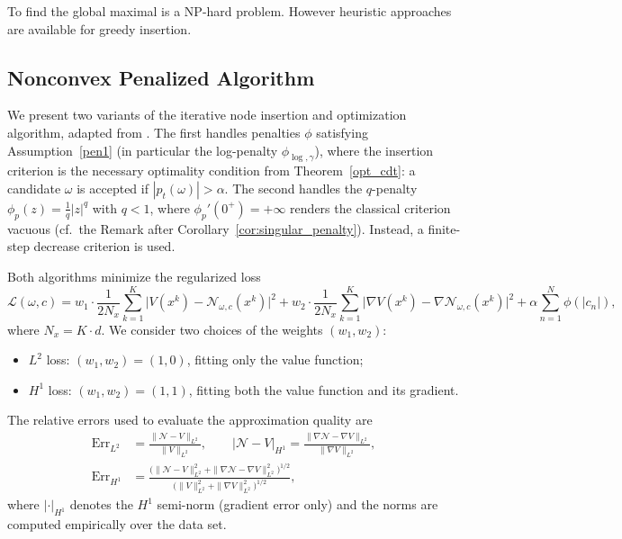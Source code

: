 \documentclass[12pt,fleqn]{amsart}
\theoremstyle{definition}
\begin{document}
To find the global maximal is a NP-hard problem. However heuristic approaches are available for greedy insertion.


\subsection{Nonconvex Penalized Algorithm}
We present two variants of the iterative node insertion and optimization algorithm, adapted from \cite{pieper2022nonconvex}.
The first handles penalties $\phi$ satisfying Assumption~\ref{pen1} (in particular the log-penalty $\phi_{\log, \gamma}$),
where the insertion criterion is the necessary optimality condition from Theorem~\ref{opt_cdt}:
a candidate $\omega$ is accepted if $|p_t(\omega)| > \alpha$.
The second handles the $q$-penalty $\phi_p(z) = \frac{1}{q}|z|^q$ with $q < 1$,
where $\phi_p'(0^+) = +\infty$ renders the classical criterion vacuous (cf.\ the Remark after Corollary~\ref{cor:singular_penalty}).
Instead, a finite-step decrease criterion is used.

Both algorithms minimize the regularized loss
\[
	\mathcal{L}(\omega, c) = w_1 \cdot \frac{1}{2N_x} \sum_{k=1}^K \big| V(x^k) - \mathcal{N}_{\omega,c}(x^k) \big|^2
	+ w_2 \cdot \frac{1}{2N_x} \sum_{k=1}^K \big| \nabla V(x^k) - \nabla \mathcal{N}_{\omega,c}(x^k) \big|^2
	+ \alpha \sum_{n=1}^N \phi(|c_n|),
\]
where $N_x = K \cdot d$. We consider two choices of the weights $(w_1, w_2)$:
\begin{itemize}
	\item $L^2$ loss: $(w_1, w_2) = (1, 0)$, fitting only the value function;
	\item $H^1$ loss: $(w_1, w_2) = (1, 1)$, fitting both the value function and its gradient.
\end{itemize}
The relative errors used to evaluate the approximation quality are
\begin{align*}
	\mathrm{Err}_{L^2} &= \frac{\| \mathcal{N} - V \|_{L^2}}{\| V \|_{L^2}}, \qquad
	|\mathcal{N} - V|_{H^1} = \frac{\| \nabla \mathcal{N} - \nabla V \|_{L^2}}{\| \nabla V \|_{L^2}}, \\
	\mathrm{Err}_{H^1} &= \frac{\big(\| \mathcal{N} - V \|_{L^2}^2 + \| \nabla \mathcal{N} - \nabla V \|_{L^2}^2\big)^{1/2}}{\big(\| V \|_{L^2}^2 + \| \nabla V \|_{L^2}^2\big)^{1/2}},
\end{align*}
where $|\cdot|_{H^1}$ denotes the $H^1$ semi-norm (gradient error only) and the norms are computed empirically over the data set.
\end{document}
